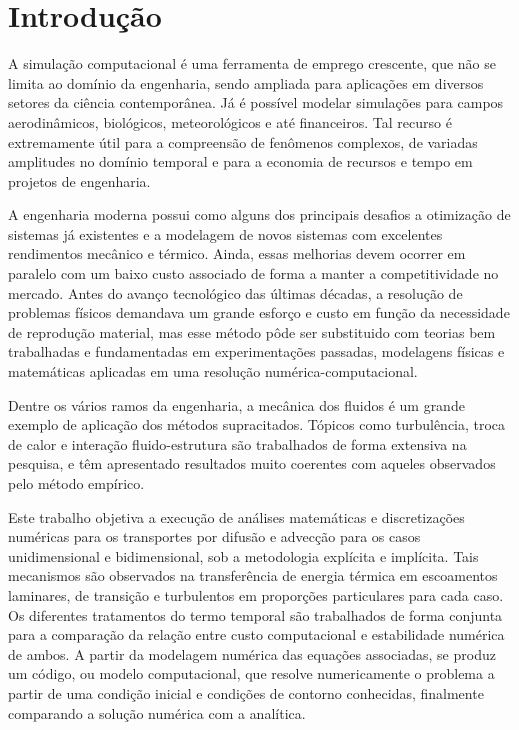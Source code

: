 \chapter{Introdução}

\noindent 

	A simulação computacional é uma ferramenta de emprego crescente, que não se limita ao domínio da engenharia, sendo ampliada para aplicações em diversos setores da ciência contemporânea. Já é possível modelar simulações para campos aerodinâmicos, biológicos, meteorológicos e até financeiros. Tal recurso é extremamente útil para a compreensão de fenômenos complexos, de variadas amplitudes no domínio temporal e para a economia de recursos e tempo em projetos de engenharia.
	
	A engenharia moderna possui como alguns dos principais desafios a otimização de sistemas já existentes e a modelagem de novos sistemas com excelentes rendimentos mecânico e térmico. Ainda, essas melhorias devem ocorrer em paralelo com um baixo custo associado de forma a manter a competitividade no mercado. Antes do avanço tecnológico das últimas décadas, a resolução de problemas físicos demandava um grande esforço e custo em função da necessidade de reprodução material, mas esse método pôde ser substituido com teorias bem trabalhadas e fundamentadas em experimentações passadas, modelagens físicas e matemáticas aplicadas em uma resolução numérica-computacional.
	
	Dentre os vários ramos da engenharia, a mecânica dos fluidos é um grande exemplo de aplicação dos métodos supracitados. Tópicos como turbulência, troca de calor e interação fluido-estrutura são trabalhados de forma extensiva na pesquisa, e têm apresentado resultados muito coerentes com aqueles observados pelo método empírico. 
	
	Este trabalho objetiva a execução de análises matemáticas e discretizações numéricas para os transportes por difusão e advecção para os casos unidimensional e bidimensional, sob a metodologia explícita e implícita. Tais mecanismos são observados na transferência de energia térmica em escoamentos laminares, de transição e turbulentos em proporções particulares para cada caso. Os diferentes tratamentos do termo temporal são trabalhados de forma conjunta para a comparação da relação entre custo computacional e estabilidade numérica de ambos. A partir da modelagem numérica das equações associadas, se produz um código, ou modelo computacional, que resolve numericamente o problema a partir de uma condição inicial e condições de contorno conhecidas, finalmente comparando a solução numérica com a analítica.
	
